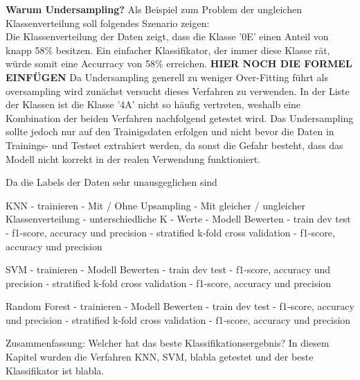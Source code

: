 \textbf{Warum Undersampling?}
Als Beispiel zum Problem der ungleichen Klassenverteilung soll folgendes Szenario zeigen: \\
Die Klassenverteilung der Daten zeigt, dass die Klasse '0E' einen Anteil von knapp 58\% besitzen. 
Ein einfacher Klassifikator, der immer diese Klasse rät, würde somit eine Accurracy von 58\% erreichen. \textbf{HIER NOCH DIE FORMEL EINFÜGEN}
Da Undersampling generell zu weniger Over-Fitting führt als oversampling wird zunächst versucht dieses Verfahren zu verwenden. \cite{fundamentals of ml}
In der Liste der Klassen ist die Klasse '4A' nicht so häufig vertreten, weshalb eine Kombination der beiden Verfahren nachfolgend getestet wird. 
Das Undersampling sollte jedoch nur auf den Trainigsdaten erfolgen und nicht bevor die Daten in Trainings- und Testset extrahiert werden, da sonst die Gefahr besteht, dass das Modell nicht korrekt in der realen Verwendung funktioniert. 




Da die Labels der Daten sehr unausgeglichen sind 



KNN
- trainieren
    - Mit / Ohne Upsampling
    - Mit gleicher / ungleicher Klassenverteilung
    - unterschiedliche K - Werte
- Modell Bewerten 
    - train dev test
    - f1-score, accuracy und precision
    - stratified k-fold cross validation
    - f1-score, accuracy und precision 

    
SVM
- trainieren
- Modell Bewerten 
    - train dev test
    - f1-score, accuracy und precision
    - stratified k-fold cross validation
    - f1-score, accuracy und precision 

Random Forest
- trainieren
- Modell Bewerten 
    - train dev test
    - f1-score, accuracy und precision
    - stratified k-fold cross validation
    - f1-score, accuracy und precision 


Zusammenfassung: Welcher hat das beste Klassifikationsergebnis?
In diesem Kapitel wurden die Verfahren KNN, SVM, blabla getestet und der beste Klassifikator ist blabla.






